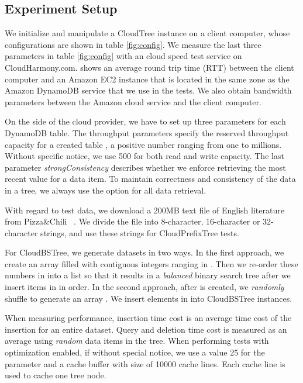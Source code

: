 \documentclass[10pt, conference, compsocconf]{IEEEtran}
\begin{document}
\subsection{Experiment Setup}
\label{setup}

We initialize and manipulate a CloudTree instance on a client computer, whose configurations are shown in
table \ref{fig:config}. 
We measure the last three parameters in table \ref{fig:config} with an cloud speed test service on CloudHarmony.com. 
 shows an average round trip time (RTT) between the client computer and an Amazon EC2 instance 
that is located in the same zone as the Amazon DynamoDB service that we use in the tests.
We also obtain bandwidth parameters between the Amazon cloud service and the client computer.

On the side of the cloud provider, we have to set up three parameters for each DynamoDB table.
The throughput parameters specify the reserved throughput capacity for a created table  \cite{RWCapacity},
a positive number ranging from one to millions. Without specific notice, we use 500 for both read and write capacity.
The last parameter \emph{strongConsistency} describes whether we 
enforce retrieving the most recent value for a data item. To maintain correctness and consistency of the data in a tree,
we always use the  option for all data retrieval.

With regard to test data, we download a 200MB text file of English literature from Pizza\&Chili~\footnotemark
{}. We divide the file into 8-character, 16-character or 32-character strings,
and use these strings for CloudPrefixTree tests. 

For CloudBSTree, 
we generate datasets in two ways. In the first approach, we create an array  filled with contiguous integers ranging in .
Then we re-order these numbers in  into a list  so that it results in a \emph{balanced} binary search tree after 
we insert items in  in order.  
In the second approach,
after  is created, we \emph{randomly} shuffle  to generate an array .
We insert elements in  into CloudBSTree instances. 

When measuring performance, insertion time cost is an average time cost of the insertion for an entire dataset.
Query and deletion time cost is measured as an average using  \emph{random} data items in the tree.
When performing tests with optimization enabled, if without special notice,
we use a value 25 for  the parameter  and a cache buffer with size of 10000 cache lines.
Each cache line is used to cache one tree node.
\end{document}

